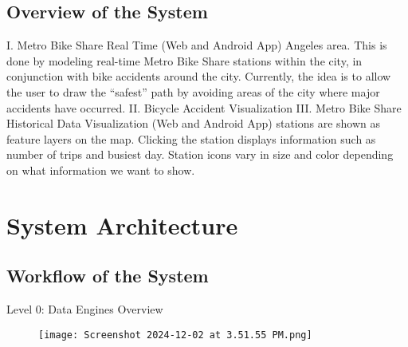 \documentclass[a4paper,12pt]{article}
\begin{document}
\subsection{Overview of the System}
I. Metro Bike Share Real Time (Web and Android App)
Angeles area. This is done by modeling real-time Metro Bike Share stations
within the city, in conjunction with bike accidents around the city. Currently, the idea is to allow the user to draw the “safest” path by avoiding areas of the city
where major accidents have occurred.
II. Bicycle Accident Visualization
III. Metro Bike Share Historical Data Visualization (Web and Android App)
stations are shown as feature layers on the map. Clicking the station displays
information such as number of trips and busiest day. Station icons vary in size and
color depending on what information we want to show.

\section{System Architecture}
\subsection{Workflow of the System}
Level 0: Data Engines Overview
\begin{figure}
    \centering
    \texttt{[image: Screenshot 2024-12-02 at 3.51.55 PM.png]}
    \label{fig:enter-label}
\end{figure} 
\end{document}
